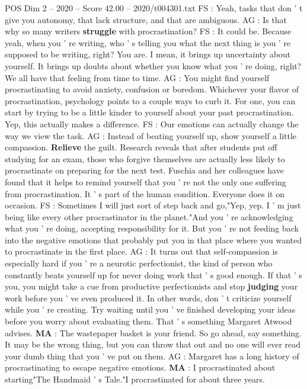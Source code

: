 \begin{textsample}{POS Dim 2 – 2020 – Score 42.00 – 2020/t004301.txt}
FS : Yeah, tasks that don ' t give you autonomy, that lack structure, and that are ambiguous.
AG : Is that why so many writers \textbf{struggle} with procrastination?
FS : It could be.
Because yeah, when you ' re writing, who ' s telling you what the next thing is you ' re supposed to be writing, right?
You are.
I mean, it brings up uncertainty about yourself.
It brings up doubts about whether you know what you ' re doing, right?
We all have that feeling from time to time.
AG : You might find yourself procrastinating to avoid anxiety, confusion or boredom.
Whichever your flavor of procrastination, psychology points to a couple ways to curb it.
For one, you can start by trying to be a little kinder to yourself about your past procrastination.
Yep, this actually makes a difference.
FS : Our emotions can actually change the way we view the task.
AG : Instead of beating yourself up, show yourself a little compassion. \textbf{Relieve} the guilt.
Research reveals that after students put off studying for an exam, those who forgive themselves are actually less likely to procrastinate on preparing for the next test.
Fuschia and her colleagues have found that it helps to remind yourself that you ' re not the only one suffering from procrastination.
It ' s part of the human condition.
Everyone does it on occasion.
FS : Sometimes I will just sort of step back and go,"Yep, yep.
I ' m just being like every other procrastinator in the planet."And you ' re acknowledging what you ' re doing, accepting responsibility for it.
But you ' re not feeding back into the negative emotions that probably put you in that place where you wanted to procrastinate in the first place.
AG : It turns out that self-compassion is especially hard if you ' re a neurotic perfectionist, the kind of person who constantly beats yourself up for never doing work that ' s good enough.
If that ' s you, you might take a cue from productive perfectionists and stop \textbf{judging} your work before you ' ve even produced it.
In other words, don ' t criticize yourself while you ' re creating.
Try waiting until you ' ve finished developing your ideas before you worry about evaluating them.
That ' s something Margaret Atwood advises. \textbf{MA} : The wastepaper basket is your friend.
So go ahead, say something.
It may be the wrong thing, but you can throw that out and no one will ever read your dumb thing that you ' ve put on them.
AG : Margaret has a long history of procrastinating to escape negative emotions. \textbf{MA} : I procrastinated about starting"The Handmaid ' s Tale."I procrastinated for about three years.

\end{textsample}
